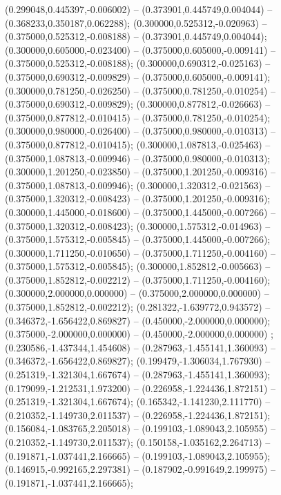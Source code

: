 (0.299048,0.445397,-0.006002) -- (0.373901,0.445749,0.004044) -- (0.368233,0.350187,0.062288);
 (0.300000,0.525312,-0.020963) -- (0.375000,0.525312,-0.008188) -- (0.373901,0.445749,0.004044);
 (0.300000,0.605000,-0.023400) -- (0.375000,0.605000,-0.009141) -- (0.375000,0.525312,-0.008188);
 (0.300000,0.690312,-0.025163) -- (0.375000,0.690312,-0.009829) -- (0.375000,0.605000,-0.009141);
 (0.300000,0.781250,-0.026250) -- (0.375000,0.781250,-0.010254) -- (0.375000,0.690312,-0.009829);
 (0.300000,0.877812,-0.026663) -- (0.375000,0.877812,-0.010415) -- (0.375000,0.781250,-0.010254);
 (0.300000,0.980000,-0.026400) -- (0.375000,0.980000,-0.010313) -- (0.375000,0.877812,-0.010415);
 (0.300000,1.087813,-0.025463) -- (0.375000,1.087813,-0.009946) -- (0.375000,0.980000,-0.010313);
 (0.300000,1.201250,-0.023850) -- (0.375000,1.201250,-0.009316) -- (0.375000,1.087813,-0.009946);
 (0.300000,1.320312,-0.021563) -- (0.375000,1.320312,-0.008423) -- (0.375000,1.201250,-0.009316);
 (0.300000,1.445000,-0.018600) -- (0.375000,1.445000,-0.007266) -- (0.375000,1.320312,-0.008423);
 (0.300000,1.575312,-0.014963) -- (0.375000,1.575312,-0.005845) -- (0.375000,1.445000,-0.007266);
 (0.300000,1.711250,-0.010650) -- (0.375000,1.711250,-0.004160) -- (0.375000,1.575312,-0.005845);
 (0.300000,1.852812,-0.005663) -- (0.375000,1.852812,-0.002212) -- (0.375000,1.711250,-0.004160);
 (0.300000,2.000000,0.000000) -- (0.375000,2.000000,0.000000) -- (0.375000,1.852812,-0.002212);
 (0.281322,-1.639772,0.943572) -- (0.346372,-1.656422,0.869827) -- (0.450000,-2.000000,0.000000);
 (0.375000,-2.000000,0.000000) -- (0.450000,-2.000000,0.000000) ;
 (0.230586,-1.437344,1.454608) -- (0.287963,-1.455141,1.360093) -- (0.346372,-1.656422,0.869827);
 (0.199479,-1.306034,1.767930) -- (0.251319,-1.321304,1.667674) -- (0.287963,-1.455141,1.360093);
 (0.179099,-1.212531,1.973200) -- (0.226958,-1.224436,1.872151) -- (0.251319,-1.321304,1.667674);
 (0.165342,-1.141230,2.111770) -- (0.210352,-1.149730,2.011537) -- (0.226958,-1.224436,1.872151);
 (0.156084,-1.083765,2.205018) -- (0.199103,-1.089043,2.105955) -- (0.210352,-1.149730,2.011537);
 (0.150158,-1.035162,2.264713) -- (0.191871,-1.037441,2.166665) -- (0.199103,-1.089043,2.105955);
 (0.146915,-0.992165,2.297381) -- (0.187902,-0.991649,2.199975) -- (0.191871,-1.037441,2.166665);
